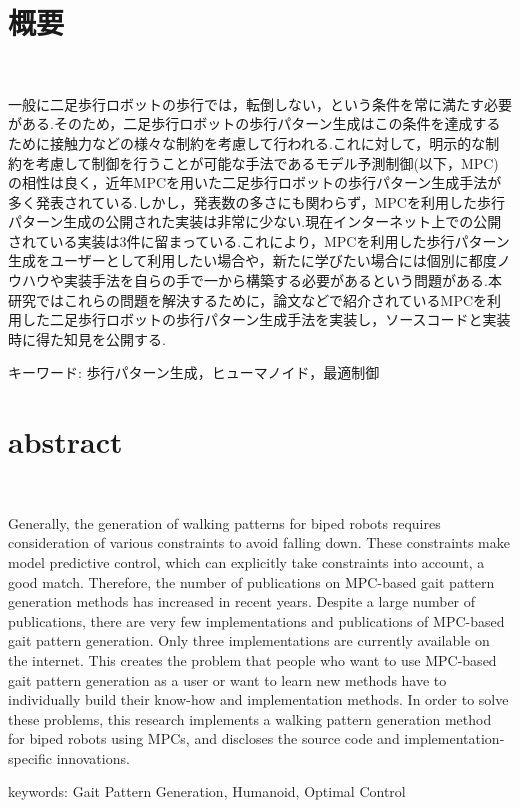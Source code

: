 \chapter*{概要}
\thispagestyle{empty}
%
\begin{center}
  \scalebox{1.5}{モデル予測制御による二足歩行ロボットの}\\
  \vspace{-0.3zh}
  \scalebox{1.5}{歩行パターン生成手法の実装と公開}
\end{center}
\vspace{1.0zh}
%

一般に二足歩行ロボットの歩行では，転倒しない，という条件を常に満たす必要がある.そのため，二足歩行ロボットの歩行パターン生成はこの条件を達成するために接触力などの様々な制約を考慮して行われる.これに対して，明示的な制約を考慮して制御を行うことが可能な手法であるモデル予測制御(以下，MPC)の相性は良く，近年MPCを用いた二足歩行ロボットの歩行パターン生成手法が多く発表されている.しかし，発表数の多さにも関わらず，MPCを利用した歩行パターン生成の公開された実装は非常に少ない.現在インターネット上での公開されている実装は3件に留まっている.これにより，MPCを利用した歩行パターン生成をユーザーとして利用したい場合や，新たに学びたい場合には個別に都度ノウハウや実装手法を自らの手で一から構築する必要があるという問題がある.本研究ではこれらの問題を解決するために，論文などで紹介されているMPCを利用した二足歩行ロボットの歩行パターン生成手法を実装し，ソースコードと実装時に得た知見を公開する.
\vspace{1.0zh}

キーワード: 歩行パターン生成，ヒューマノイド，最適制御
%
\newpage
\chapter*{abstract}
\thispagestyle{empty}
%
\begin{center}
  \scalebox{1.5}{Implementation and publication of a walking pattern generation}\\
  \vspace{-0.3zh}
  \scalebox{1.5}{for biped robots using model predictive control}
\end{center}
\vspace{1.0zh}
%


Generally, the generation of walking patterns for biped robots requires consideration of various constraints to avoid falling down. These constraints make model predictive control, which can explicitly take constraints into account, a good match. Therefore, the number of publications on MPC-based gait pattern generation methods has increased in recent years. Despite a large number of publications, there are very few implementations and publications of MPC-based gait pattern generation. Only three implementations are currently available on the internet. This creates the problem that people who want to use MPC-based gait pattern generation as a user or want to learn new methods have to individually build their know-how and implementation methods. In order to solve these problems, this research implements a walking pattern generation method for biped robots using MPCs, and discloses the source code and implementation-specific innovations.
\vspace{1.0zh}

keywords: Gait Pattern Generation, Humanoid, Optimal Control
